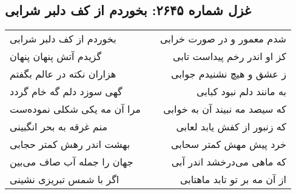 \begin{center}
\section*{غزل شماره ۲۶۴۵: بخوردم از کف دلبر شرابی}
\label{sec:2645}
\begin{longtable}{l p{0.5cm} r}
بخوردم از کف دلبر شرابی
&&
شدم معمور و در صورت خرابی
\\
گزیدم آتش پنهان پنهان
&&
کز او اندر رخم پیداست تابی
\\
هزاران نکته در عالم بگفتم
&&
ز عشق و هیچ نشنیدم جوابی
\\
گهی سوزد دلم گه خام گردد
&&
به مانند دلم نبود کبابی
\\
مرا آن مه یکی شکلی نموده‌ست
&&
که سیصد مه نبیند آن به خوابی
\\
منم غرقه به بحر انگبینی
&&
که زنبور از کفش یابد لعابی
\\
بهشت اندر رهش کمتر حجابی
&&
خرد پیش مهش کمتر سحابی
\\
جهان را جمله آب صاف می‌بین
&&
که ماهی می‌درخشد اندر آبی
\\
اگر با شمس تبریزی نشینی
&&
از آن مه بر تو تابد ماهتابی
\\
\end{longtable}
\end{center}
